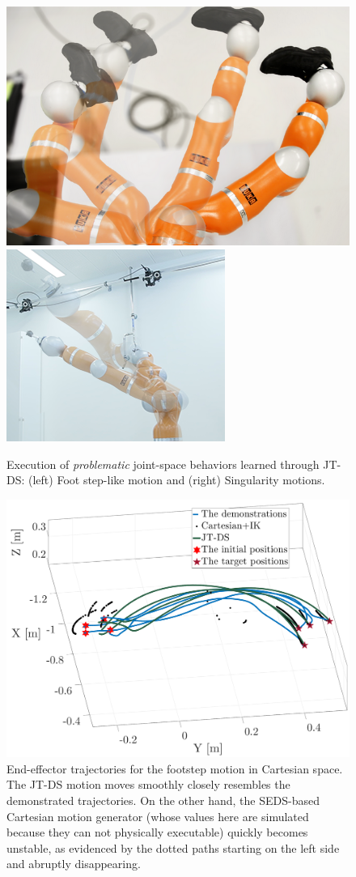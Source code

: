 \documentclass[letterpaper, 10 pt, journal, twoside, fleqn]{IEEEtran}
\begin{document}
\begin{figure}[t]
	\begin{minipage}[b]{\linewidth}
		\centering
		\includegraphics[angle=180,origin=c,width=0.5\linewidth]{./figures/footstep_execution_crop.png}\hspace{5pt}\includegraphics[width=0.4\linewidth]{../new-pics/singularity_crop.png}
		\caption{Execution of \textit{problematic} joint-space behaviors learned through JT-DS: (left) Foot step-like motion and (right) Singularity motions.}
		\label{fig:snapshot:c}
	\end{minipage}
	\begin{minipage}[b]{\linewidth}
		\centering
		\includegraphics[width=0.7\linewidth]{./figures/Foot.pdf}
		\caption{End-effector trajectories for the footstep motion in Cartesian space. The JT-DS motion moves smoothly closely resembles the demonstrated trajectories. On the other hand, the SEDS-based Cartesian motion generator (whose values here are simulated because they can not physically executable) quickly becomes unstable, as evidenced by the dotted paths starting on the left side and abruptly disappearing. \label{fig:foot}}
		\vspace{-10pt}
	\end{minipage}
	\vspace{-20pt}
\end{figure}
\end{document}
